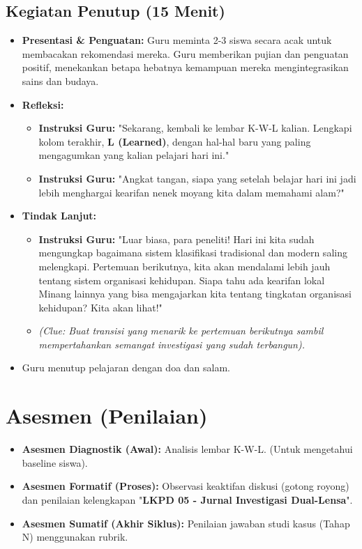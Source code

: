 \documentclass[a4paper,12pt]{article}
\begin{document}
\subsection{Kegiatan Penutup (15 Menit)}
\begin{itemize}
\item \textbf{Presentasi \& Penguatan:} Guru meminta 2-3 siswa secara acak untuk membacakan rekomendasi mereka. Guru memberikan pujian dan penguatan positif, menekankan betapa hebatnya kemampuan mereka mengintegrasikan sains dan budaya.
\item \textbf{Refleksi:}
    \begin{itemize}
    \item \textbf{Instruksi Guru:} "Sekarang, kembali ke lembar K-W-L kalian. Lengkapi kolom terakhir, \textbf{L (Learned)}, dengan hal-hal baru yang paling mengagumkan yang kalian pelajari hari ini."
    \item \textbf{Instruksi Guru:} "Angkat tangan, siapa yang setelah belajar hari ini jadi lebih menghargai kearifan nenek moyang kita dalam memahami alam?"
    \end{itemize}
\item \textbf{Tindak Lanjut:}
    \begin{itemize}
    \item \textbf{Instruksi Guru:} "Luar biasa, para peneliti! Hari ini kita sudah mengungkap bagaimana sistem klasifikasi tradisional dan modern saling melengkapi. Pertemuan berikutnya, kita akan mendalami lebih jauh tentang sistem organisasi kehidupan. Siapa tahu ada kearifan lokal Minang lainnya yang bisa mengajarkan kita tentang tingkatan organisasi kehidupan? Kita akan lihat!"
    \item \textit{(Clue: Buat transisi yang menarik ke pertemuan berikutnya sambil mempertahankan semangat investigasi yang sudah terbangun).}
    \end{itemize}
\item Guru menutup pelajaran dengan doa dan salam.
\end{itemize}

\section{Asesmen (Penilaian)}

\begin{itemize}
\item \textbf{Asesmen Diagnostik (Awal):} Analisis lembar K-W-L. (Untuk mengetahui baseline siswa).
\item \textbf{Asesmen Formatif (Proses):} Observasi keaktifan diskusi (gotong royong) dan penilaian kelengkapan "\textbf{LKPD 05 - Jurnal Investigasi Dual-Lensa}".
\item \textbf{Asesmen Sumatif (Akhir Siklus):} Penilaian jawaban studi kasus (Tahap N) menggunakan rubrik.
\end{itemize}
\end{document}
